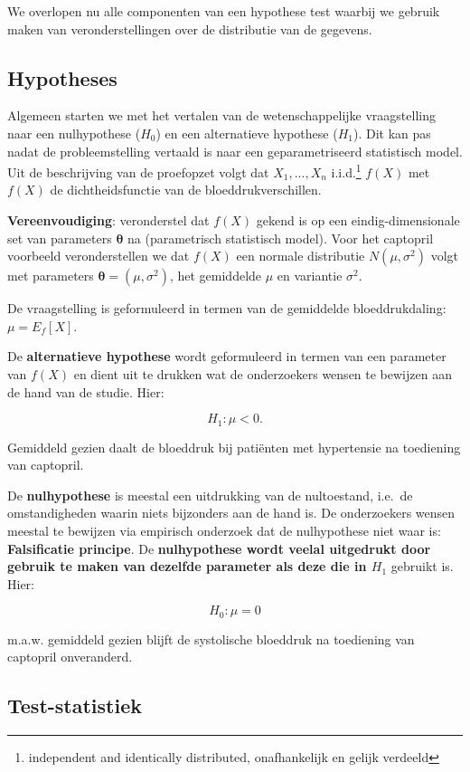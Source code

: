 \documentclass[
  12pt,dutch,coursenotes]{book}
\begin{document}
We overlopen nu alle componenten van een hypothese test waarbij we gebruik maken van veronderstellingen over de distributie van de gegevens.

\hypertarget{hypotheses}{%
\subsection{Hypotheses}\label{hypotheses}}

Algemeen starten we met het vertalen van de wetenschappelijke vraagstelling naar een nulhypothese (\(H_0\)) en een alternatieve hypothese (\(H_1\)).
Dit kan pas nadat de probleemstelling vertaald is naar een geparametriseerd statistisch model.
Uit de beschrijving van de proefopzet volgt dat \(X_1,...,X_n\) i.i.d.\footnote{independent and identically distributed, onafhankelijk en gelijk verdeeld} \(f(X)\)
met \(f(X)\) de dichtheidsfunctie van de bloeddrukverschillen.

\textbf{Vereenvoudiging}: veronderstel dat \(f(X)\) gekend is op een eindig-dimensionale set van parameters \(\mathbf{\theta}\) na (parametrisch statistisch model).
Voor het captopril voorbeeld veronderstellen we dat \(f(X)\) een normale distributie \(N(\mu,\sigma^2)\) volgt met parameters \(\mathbf{\theta}=(\mu,\sigma^2)\), het gemiddelde \(\mu\) en variantie \(\sigma^2\).

De vraagstelling is geformuleerd in termen van de gemiddelde bloeddrukdaling: \(\mu=E_f[X]\).

De \textbf{alternatieve hypothese} wordt geformuleerd in termen van een parameter van \(f(X)\) en dient uit te drukken wat de onderzoekers wensen te bewijzen aan de hand van de studie.
Hier:

\[H_1: \mu<0.\]

Gemiddeld gezien daalt de bloeddruk bij patiënten met hypertensie na toediening van captopril.

De \textbf{nulhypothese} is meestal een uitdrukking van de nultoestand, i.e.~de omstandigheden waarin niets bijzonders aan de hand is.
De onderzoekers wensen meestal te bewijzen via empirisch onderzoek dat de nulhypothese niet waar is:
\textbf{Falsificatie principe}.
De \textbf{nulhypothese wordt veelal uitgedrukt door gebruik te maken van dezelfde parameter als deze die in \(H_1\)} gebruikt is. Hier:

\[H_0 : \mu=0\]

m.a.w. gemiddeld gezien blijft de systolische bloeddruk na toediening van captopril onveranderd.

\hypertarget{test-statistiek}{%
\subsection{Test-statistiek}\label{test-statistiek}}
\end{document}
